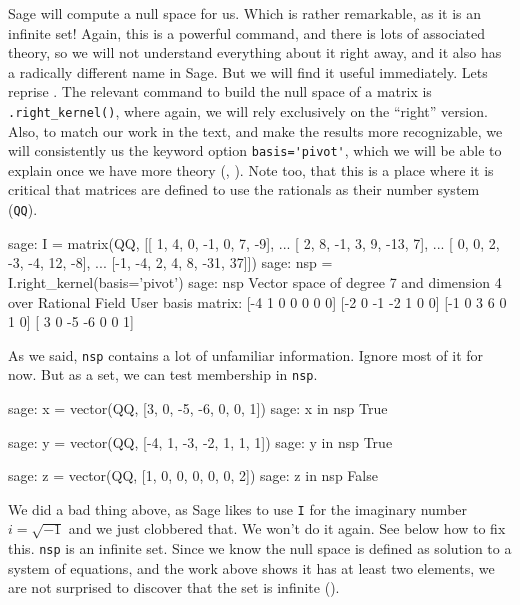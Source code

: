 Sage will compute a null space for us.  Which is rather remarkable, as it is an infinite set!  Again, this is a powerful command, and there is lots of associated theory, so we will not understand everything about it right away, and it also has a radically different name in Sage.  But we will find it useful immediately.  Lets reprise .  The relevant command to build the null space of a matrix is \verb?.right_kernel()?, where again, we will rely exclusively on the ``right'' version.  Also, to match our work in the text, and make the results more recognizable, we will consistently us the keyword option \verb?basis='pivot'?, which we will be able to explain once we have more theory (, ).  Note too, that this is a place where it is critical that matrices are defined to use the rationals as their number system (\verb?QQ?).
%
\begin{sageexample}
sage: I = matrix(QQ, [[ 1,  4,  0, -1,  0,   7, -9],
...                   [ 2,  8, -1,  3,  9, -13,  7],
...                   [ 0,  0,  2, -3, -4,  12, -8],
...                   [-1, -4,  2,  4,  8, -31, 37]])
sage: nsp = I.right_kernel(basis='pivot')
sage: nsp
Vector space of degree 7 and dimension 4 over Rational Field
User basis matrix:
[-4  1  0  0  0  0  0]
[-2  0 -1 -2  1  0  0]
[-1  0  3  6  0  1  0]
[ 3  0 -5 -6  0  0  1]
\end{sageexample}
%
As we said, \verb?nsp? contains a lot of unfamiliar information.  Ignore most of it for now.  But as a set, we can test membership in \verb?nsp?.
%
\begin{sageexample}
sage: x = vector(QQ, [3, 0, -5, -6, 0, 0, 1])
sage: x in nsp
True
\end{sageexample}
%
\begin{sageexample}
sage: y = vector(QQ, [-4, 1, -3, -2, 1, 1, 1])
sage: y in nsp
True
\end{sageexample}
%
\begin{sageexample}
sage: z = vector(QQ, [1, 0, 0, 0, 0, 0, 2])
sage: z in nsp
False
\end{sageexample}
%
We did a bad thing above, as Sage likes to use \verb?I? for the imaginary number $i=\sqrt{-1}$ and we just clobbered that.  We won't do it again.  See below how to fix this.
%
\verb?nsp? is an infinite set.  Since we know the null space is defined as solution to a system of equations, and the work above shows it has at least two elements, we are not surprised to discover that the set is infinite ().
%
